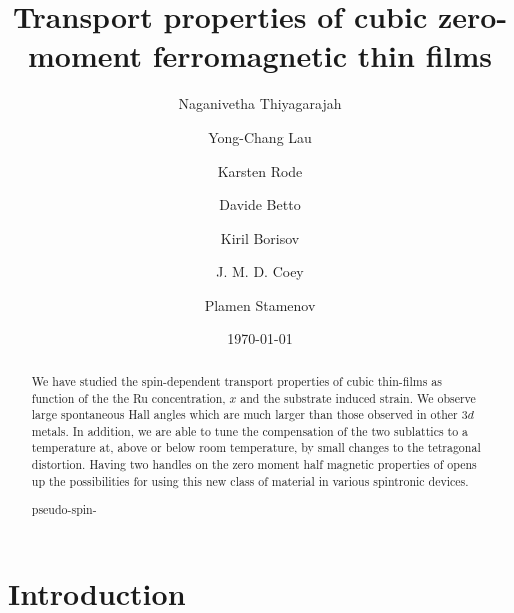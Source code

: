 \documentclass[reprint,aip,apl,floatfix,linenumbers,superscriptaddress]{revtex4-1}
\begin{document}
\title{Transport properties of cubic zero-moment ferromagnetic  thin films}
\author{Naganivetha Thiyagarajah}
\author{Yong-Chang Lau}
\author{Karsten Rode}
\author{Davide Betto}
\author{Kiril Borisov}
\author{J. M. D. Coey}
\author{Plamen Stamenov}

\date{\today}

\begin{abstract}
We have studied the spin-dependent transport properties of cubic  thin-films as function of the the Ru concentration, $x$ and the 
substrate induced strain. We observe large spontaneous Hall angles which are 
much larger than those observed in other $3d$ metals. In addition, we are 
able to tune the compensation of the two  sublattics to a temperature 
at, above or below room temperature, by small changes to the tetragonal 
distortion. Having two handles on the zero moment half magnetic properties of 
 opens up the possibilities for using this new class of 
material in various spintronic devices. 

pseudo-spin- %


\end{abstract}
\maketitle

\section{Introduction}
\label{sec:intro}
\end{document}

